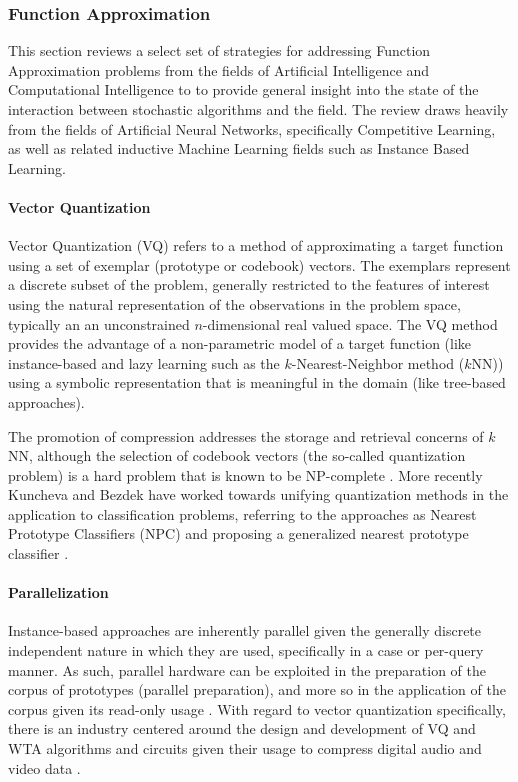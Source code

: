 %
%
\subsubsection{Function Approximation}
This section reviews a select set of strategies for addressing Function Approximation problems from the fields of Artificial Intelligence and Computational Intelligence to to provide general insight into the state of the interaction between stochastic algorithms and the field. The review draws heavily from the fields of Artificial Neural Networks, specifically Competitive Learning, as well as related inductive Machine Learning fields such as Instance Based Learning.

\paragraph{Vector Quantization}
Vector Quantization (VQ) refers to a method of approximating a target function using a set of exemplar (prototype or codebook) vectors. The exemplars represent a discrete subset of the problem, generally restricted to the features of interest using the natural representation of the observations in the problem space, typically an an unconstrained $n$-dimensional real valued space. The VQ method provides the advantage of a non-parametric model of a target function (like instance-based and lazy learning such as the $k$-Nearest-Neighbor method ($k$NN)) using a symbolic representation that is meaningful in the domain (like tree-based approaches). 

The promotion of compression addresses the storage and retrieval concerns of $k$NN, although the selection of codebook vectors (the so-called quantization problem) is a hard problem that is known to be NP-complete \cite{Garey1982}. More recently Kuncheva and Bezdek have worked towards unifying quantization methods in the application to classification problems, referring to the approaches as Nearest Prototype Classifiers (NPC) and proposing a generalized nearest prototype classifier \cite{Kuncheva1998, Kuncheva1998a}.
	
\paragraph{Parallelization} 
Instance-based approaches are inherently parallel given the generally discrete independent nature in which they are used, specifically in a case or per-query manner. As such, parallel hardware can be exploited in the preparation of the corpus of prototypes (parallel preparation), and more so in the application of the corpus given its read-only usage \cite{Aamodt1994, Nagendra1996, Plaza1997}. With regard to vector quantization specifically, there is an industry centered around the design and development of VQ and WTA algorithms and circuits given their usage to compress digital audio and video data \cite{Nakada1999, Parhi1994}.
	
